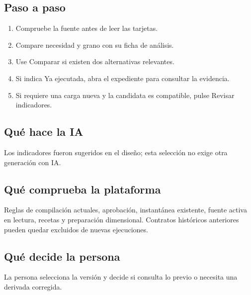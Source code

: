 \subsection{Paso a paso}
\begin{enumerate}
\item Compruebe la fuente antes de leer las tarjetas.\par\nopagebreak[4]
\item Compare necesidad y grano con su ficha de análisis.\par\nopagebreak[4]
\item Use Comparar si existen dos alternativas relevantes.\par\nopagebreak[4]
\item Si indica Ya ejecutada, abra el expediente para consultar la evidencia.\par\nopagebreak[4]
\item Si requiere una carga nueva y la candidata es compatible, pulse Revisar indicadores.\par\nopagebreak[4]
\end{enumerate}
\subsection{Qué hace la IA}
Los indicadores fueron sugeridos en el diseño; esta selección no exige otra generación con IA.

\subsection{Qué comprueba la plataforma}
Reglas de compilación actuales, aprobación, instantánea existente, fuente activa en lectura, recetas y preparación dimensional. Contratos históricos anteriores pueden quedar excluidos de nuevas ejecuciones.

\subsection{Qué decide la persona}
La persona selecciona la versión y decide si consulta lo previo o necesita una derivada corregida.

